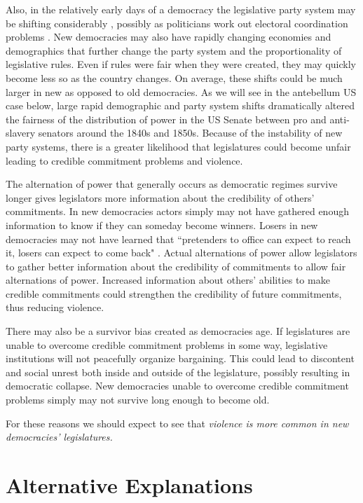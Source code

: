 \documentclass[a4paper]{article}\usepackage[]{graphicx}\usepackage[]{color}
\begin{document}
Also, in the relatively early days of a democracy the legislative party system may be shifting considerably \cite[see][161 for a review]{Mainwaring2007b}, possibly as politicians work out electoral coordination problems \citep{cox1997}. New democracies may also have rapidly changing economies and demographics that further change the party system and the proportionality of legislative rules. Even if rules were fair when they were created, they may quickly become less so as the country changes. On average, these shifts could be much larger in new as opposed to old democracies. As we will see in the antebellum US case below, large rapid demographic and party system shifts dramatically altered the fairness of the distribution of power in the US Senate between pro and anti-slavery senators around the 1840s and 1850s. Because of the instability of new party systems, there is a greater likelihood that legislatures could become unfair leading to credible commitment problems and violence.

The alternation of power that generally occurs as democratic regimes survive longer gives legislators more information about the credibility of others' commitments. In new democracies actors simply may not have gathered enough information to know if they can someday become winners. Losers in new democracies may not have learned that ``pretenders to office can expect to reach it, losers can expect to come back" \citep[][36]{Przeworski1991}. Actual alternations of power allow legislators to gather better information about the credibility of commitments to allow fair alternations of power. Increased information about others' abilities to make credible commitments could strengthen the credibility of future commitments, thus reducing violence.

There may also be a survivor bias created as democracies age. If legislatures are unable to overcome credible commitment problems in some way, legislative institutions will not peacefully organize bargaining. This could lead to discontent and social unrest both inside and outside of the legislature, possibly resulting in democratic collapse. New democracies unable to overcome credible commitment problems simply may not survive long enough to become old.

For these reasons we should expect to see that \emph{violence is more common in new democracies' legislatures.}

\section{Alternative Explanations}
\end{document}

